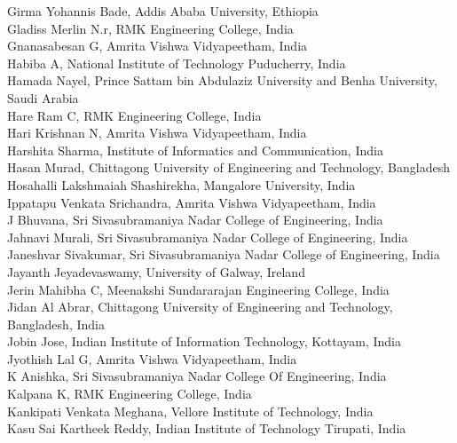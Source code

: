 \documentclass[11pt,oneside]{book}
\begin{document}
\begin{description}
          Girma Yohannis Bade, Addis Ababa University, Ethiopia\\
          Gladiss Merlin N.r, RMK Engineering College, India\\
          Gnanasabesan G, Amrita Vishwa Vidyapeetham, India\\
          Habiba A, National Institute of Technology Puducherry, India\\
          Hamada Nayel, Prince Sattam bin Abdulaziz University and Benha University, Saudi Arabia\\
          Hare Ram C, RMK Engineering College, India\\
          Hari Krishnan N, Amrita Vishwa Vidyapeetham, India\\
          Harshita Sharma, Institute of Informatics and Communication, India\\
          Hasan Murad, Chittagong University of Engineering and Technology, Bangladesh\\
          Hosahalli Lakshmaiah Shashirekha, Mangalore University, India\\
          Ippatapu Venkata Srichandra, Amrita Vishwa Vidyapeetham, India\\
          J Bhuvana, Sri Sivasubramaniya Nadar College of Engineering, India\\
          Jahnavi Murali, Sri Sivasubramaniya Nadar College of Engineering, India\\
          Janeshvar Sivakumar, Sri Sivasubramaniya Nadar College of Engineering, India\\
          Jayanth Jeyadevaswamy, University of Galway, Ireland\\
          Jerin Mahibha C, Meenakshi Sundararajan Engineering College, India\\
          Jidan Al Abrar, Chittagong University of Engineering and Technology, Bangladesh, India\\
          Jobin Jose, Indian Institute of Information Technology, Kottayam, India\\
          Jyothish Lal G, Amrita Vishwa Vidyapeetham, India\\
          K Anishka, Sri Sivasubramaniya Nadar College Of Engineering, India\\
          Kalpana K, RMK Engineering College, India\\
          Kankipati Venkata Meghana, Vellore Institute of Technology, India\\
          Kasu Sai Kartheek Reddy, Indian Institute of Technology Tirupati, India\\

\end{description}
\end{document}
